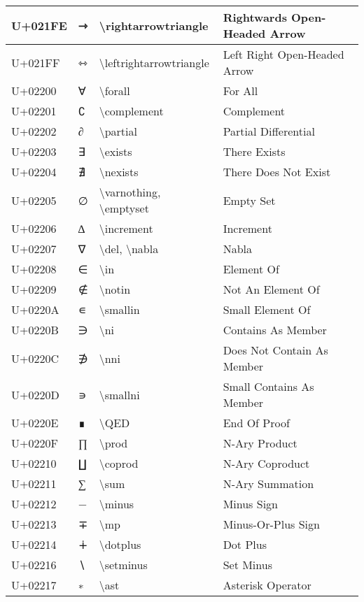 \begin{table}[h]
\begin{tabulary}{\linewidth}{|L|L|L|L|}
\hline
U+021FE & ⇾ & {\textbackslash}rightarrowtriangle & Rightwards Open-Headed Arrow \\
\hline
U+021FF & ⇿ & {\textbackslash}leftrightarrowtriangle & Left Right Open-Headed Arrow \\
\hline
U+02200 & ∀ & {\textbackslash}forall & For All \\
\hline
U+02201 & ∁ & {\textbackslash}complement & Complement \\
\hline
U+02202 & ∂ & {\textbackslash}partial & Partial Differential \\
\hline
U+02203 & ∃ & {\textbackslash}exists & There Exists \\
\hline
U+02204 & ∄ & {\textbackslash}nexists & There Does Not Exist \\
\hline
U+02205 & ∅ & {\textbackslash}varnothing, {\textbackslash}emptyset & Empty Set \\
\hline
U+02206 & ∆ & {\textbackslash}increment & Increment \\
\hline
U+02207 & ∇ & {\textbackslash}del, {\textbackslash}nabla & Nabla \\
\hline
U+02208 & ∈ & {\textbackslash}in & Element Of \\
\hline
U+02209 & ∉ & {\textbackslash}notin & Not An Element Of \\
\hline
U+0220A & ∊ & {\textbackslash}smallin & Small Element Of \\
\hline
U+0220B & ∋ & {\textbackslash}ni & Contains As Member \\
\hline
U+0220C & ∌ & {\textbackslash}nni & Does Not Contain As Member \\
\hline
U+0220D & ∍ & {\textbackslash}smallni & Small Contains As Member \\
\hline
U+0220E & ∎ & {\textbackslash}QED & End Of Proof \\
\hline
U+0220F & ∏ & {\textbackslash}prod & N-Ary Product \\
\hline
U+02210 & ∐ & {\textbackslash}coprod & N-Ary Coproduct \\
\hline
U+02211 & ∑ & {\textbackslash}sum & N-Ary Summation \\
\hline
U+02212 & − & {\textbackslash}minus & Minus Sign \\
\hline
U+02213 & ∓ & {\textbackslash}mp & Minus-Or-Plus Sign \\
\hline
U+02214 & ∔ & {\textbackslash}dotplus & Dot Plus \\
\hline
U+02216 & ∖ & {\textbackslash}setminus & Set Minus \\
\hline
U+02217 & ∗ & {\textbackslash}ast & Asterisk Operator \\

\end{tabulary}
\end{table}
